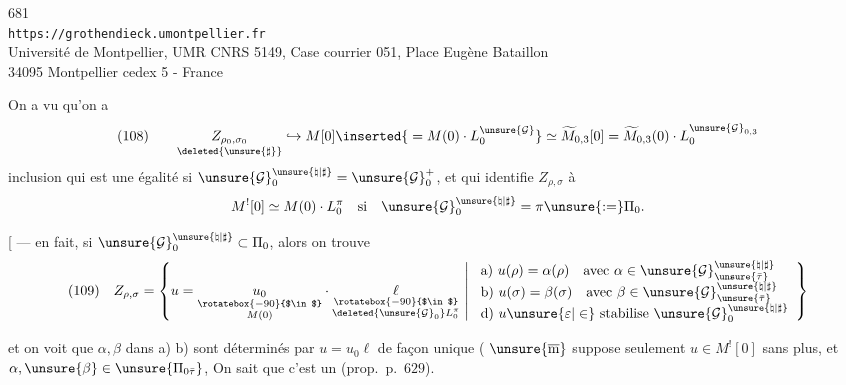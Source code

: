 \begin{center}
681\\
\texttt{https://grothendieck.umontpellier.fr}\\
Université de Montpellier, UMR CNRS 5149, Case courrier 051, Place Eugène Bataillon\\
34095 Montpellier cedex 5 - France
\end{center}



On a vu qu'on a
\[
(108)\qquad
\underset{\deleted{\unsure{\sharp}}}{Z_{\rho_0,\sigma_0}}
\hookrightarrow M[0]\inserted{{}=M(0)\cdot L_0^{\unsure{\mathcal G}}}
\simeq \widetilde M_{0,3}[0]
=\widetilde M_{0,3}(0)\cdot L_0^{\unsure{\mathcal G}_{0,3}}
\]
inclusion qui est une égalité si
$\unsure{\mathcal G}_0^{\unsure{\natural|\sharp}}=\unsure{\mathcal G}_0^+$,
et qui identifie $Z_{\rho,\sigma}$ à
\[
M^{!}[0]\simeq M(0)\cdot L_0^\pi
\quad\text{si}\quad
\unsure{\mathcal G}_0^{\unsure{\natural|\sharp}}=\pi\unsure{:=}\Pi_0.
\]

[ --- en fait, si
$\unsure{\mathcal G}_0^{\unsure{\natural|\sharp}}\subset\Pi_0$,
alors on trouve
\[
\begin{split}
(109)\quad Z_{\rho,\sigma}=\left\{
u=\underset{\substack{\rotatebox{-90}{$\in$}\\M(0)}}{u_0}\cdot
\underset{\substack{\rotatebox{-90}{$\in$}\\\deleted{\unsure{\mathcal G}_0}L_0^\pi}}{\ell}
\ \middle|\
\begin{array}{l}
\text{a) }u(\rho)=\alpha(\rho)\quad\text{avec }\alpha\in
\unsure{\mathcal G}_{\unsure{\bar\tau}}^{\unsure{\natural|\sharp}}\\
\text{b) }u(\sigma)=\beta(\sigma)\quad\text{avec }\beta\in
\unsure{\mathcal G}_{\unsure{\bar\tau}}^{\unsure{\natural|\sharp}}\\
\text{d) }u\unsure{\varepsilon|\in}\text{ stabilise }
\unsure{\mathcal G}_0^{\unsure{\natural|\sharp}}
\end{array}\right\}
\end{split}
\]

et on voit que $\alpha,\beta$ dans a) b) sont déterminés par
$u=u_0\ell$ de façon unique
( $\unsure{\overline{\mathrm m}}$
 suppose seulement $u\in M^{!}[0]$ sans plus,
et \inserted{\unsure{qu'on exige}}
$\alpha,\unsure{\beta}\in\unsure{\Pi_{0\bar\tau}}$,
On sait que c'est un 
(prop.\ p.\ $629$).

